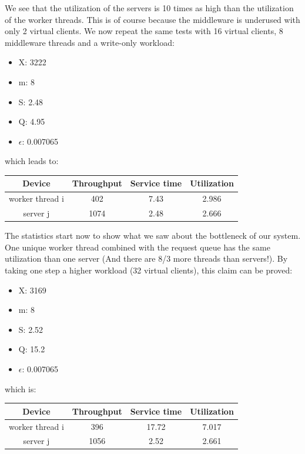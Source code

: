 \documentclass[11pt,a4paper]{article}
\begin{document}
We see that the utilization of the servers is 10 times as high than the utilization of the worker threads. This is of course because the middleware is underused with only 2 virtual clients. We now repeat the same tests with 16 virtual clients, 8 middleware threads and a write-only workload:
\begin{itemize}
\item X: 3222
\item m: 8
\item S: 2.48
\item Q: 4.95
\item \(\epsilon \): 0.007065
\end{itemize}
which leads to:
\begin{center}
		\begin{tabular}{|c|c|c|c|}
			  \hline
			  \textbf{Device} & \textbf{Throughput} & \textbf{Service time} & \textbf{Utilization} \\
			  \hline
			  worker thread i  &402  & 7.43  &2.986\\
			  server j & 1074 & 2.48 &2.666 \\
			  \hline
		\end{tabular}
 \end{center}
The statistics start now to show what we saw about the bottleneck of our system. One unique worker thread combined with the request queue has the same utilization than one server (And there are 8/3 more threads than servers!). By taking one step a higher workload (32 virtual clients), this claim can be proved:
\begin{itemize}
\item X: 3169
\item m: 8
\item S: 2.52
\item Q: 15.2
\item \(\epsilon \): 0.007065
\end{itemize}
which is:
\begin{center}
		\begin{tabular}{|c|c|c|c|}
			  \hline
			  \textbf{Device} & \textbf{Throughput} & \textbf{Service time} & \textbf{Utilization} \\
			  \hline
			  worker thread i  &396  & 17.72  &7.017\\
			  server j & 1056 & 2.52 &2.661 \\
			  \hline
		\end{tabular}
\end{center}
\end{document}
